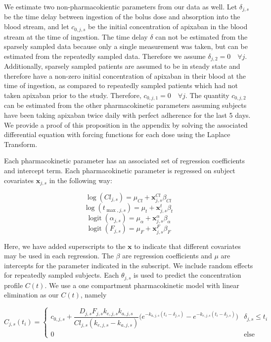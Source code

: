 We estimate two non-pharmacokientic parameters from our data as well.  Let $\delta_{j, s}$ be the time delay between ingestion of the bolus dose and absorption into the blood stream, and let $c_{0, j, s}$ be the initial concentration of apixaban in the blood stream at the time of ingestion.  The time delay $\delta$ can not be estimated from the sparsely sampled data because only a single measurement was taken, but can be estimated from the repeatedly sampled data.  Therefore we assume $\delta_{j, 2}=0 \quad \forall j$.  Additionally, sparsely sampled patients are assumed to be in steady state and therefore have a non-zero initial concentration of apixaban in their blood at the time of ingestion, as compared to repeatedly sampled patients which had not taken apixaban prior to the study.  Therefore, $c_{0, j, 1} = 0 \quad \forall j$.  The quantity $c_{0, j , 2}$ can be estimated from the other pharmacokinetic parameters assuming subjects have been taking apixaban twice daily with perfect adherence for the last 5 days.  We provide a proof of this proposition in the appendix by solving the associated differential equation with forcing functions for each dose using the Laplace Transform.

Each pharmacokinetic parameter has an associated set of regression coefficients and intercept term.  Each pharmacokinetic parameter is regressed on subject covariates $\mathbf{x}_{j, s}$ in the following way:

$$ \log(Cl_{j, s}) = \mu_{Cl} + \mathbf{x}_{j, s}^{Cl} \beta_{Cl} $$
$$ \log(t_{\max,j, s}) = \mu_{t} + \mathbf{x}_{j, s}^{t} \beta_{t} $$
$$ \operatorname{logit}(\alpha_{j, s}) = \mu_{\alpha} + \mathbf{x}_{j, s}^\alpha \beta_{\alpha} $$
$$ \operatorname{logit}(F_{j, s}) = \mu_{F} + \mathbf{x}_{j, s}^{F} \beta_{F} $$

Here, we have added superscripts to the $\mathbf{x}$ to indicate that different covariates may be used in each regression. The $\beta$ are regression coefficients and $\mu$ are intercepts for the parameter indicated in the subscript. We include random effects for repeatedly sampled subjects. Each $\theta_{j, s}$ is used to predict the concentration profile $C(t)$.  We use a one compartment pharmacokinetic model with linear elimination as our $C(t)$, namely

$$ C_{j, s}(t_i) =  \begin{cases} c_{0, j, s} + \dfrac{D_{j, s} F_{j, s} k_{e, j, s} k_{a, j, s}}{Cl_{j, s}(k_{e, j, s} - k_{a, j, s})} \Bigg( e^{-k_{a, j, s}(t_i - \delta_{j, s})} - e^{-k_{e, j, s}(t_i - \delta_{j, s})} \Bigg)  & \delta_{j, s} \leq t_i \\ 0 & \mbox{else} \end{cases}$$

